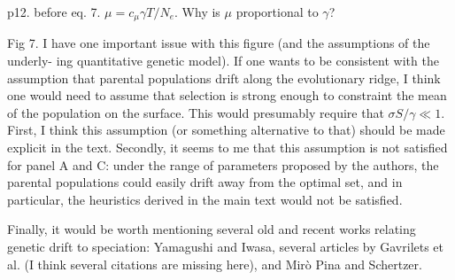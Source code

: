 
\begin{point}{p12. before eq. 7.}
    $\mu = c_\mu \gamma T /N_e$. Why is $\mu$ proportional to $\gamma$?
\end{point}


\begin{point}{Fig 7.}
    I have one important issue with this figure (and the assumptions of the underly-
ing quantitative genetic model). If one wants to be consistent with the assumption that
parental populations drift along the evolutionary ridge, I think one would need to assume
that selection is strong enough to constraint the mean of the population on the surface. This
would presumably require that $\sigma S /\gamma \ll 1$. First, I think this assumption (or something
alternative to that) should be made explicit in the text. Secondly, it seems to me that this
assumption is not satisfied for panel A and C: under the range of parameters proposed by
the authors, the parental populations could easily drift away from the optimal set, and in
particular, the heuristics derived in the main text would not be satisfied.
\end{point}


\begin{point}{}
    Finally, it would be worth mentioning several old and recent works relating genetic drift
to speciation: Yamagushi and Iwasa, several articles by Gavrilets et al. (I think several
citations are missing here), and Mirò Pina and Schertzer.
\end{point}




